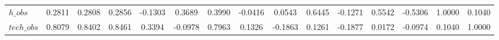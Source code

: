 \begin{center}
\begin{longtable}{lcccccccccccccc}
$h\_obs         $	 & 	           0.2811	 & 	           0.2808	 & 	           0.2856	 & 	          -0.1303	 & 	           0.3689	 & 	           0.3990	 & 	          -0.0416	 & 	           0.0543	 & 	           0.6445	 & 	          -0.1271	 & 	           0.5542	 & 	          -0.5306	 & 	           1.0000	 & 	           0.1040 \\ 
$tech\_obs      $	 & 	           0.8079	 & 	           0.8402	 & 	           0.8461	 & 	           0.3394	 & 	          -0.0978	 & 	           0.7963	 & 	           0.1326	 & 	          -0.1863	 & 	           0.1261	 & 	          -0.1877	 & 	           0.0172	 & 	          -0.0974	 & 	           0.1040	 & 	           1.0000 \\ 
\end{longtable}
 \end{center}
